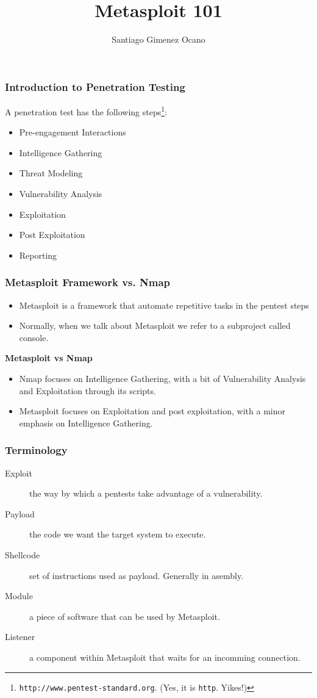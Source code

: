 \documentclass[aspectratio=169]{beamer}
\title{Metasploit 101}
\author{Santiago Gimenez Ocano}
\date{}
\begin{document}
\frame{\titlepage}

\begin{frame}
\frametitle{Introduction to Penetration Testing}
A penetration test has the following steps\footnote{\texttt{http://www.pentest-standard.org}. (Yes, it is \texttt{http}. Yikes!)}:

\begin{itemize}
    \item Pre-engagement Interactions
    \item Intelligence Gathering
    \item Threat Modeling
    \item Vulnerability Analysis
    \item Exploitation
    \item Post Exploitation
    \item Reporting
\end{itemize}

\end{frame}

\begin{frame}
\frametitle{Metasploit Framework vs. Nmap}

\begin{itemize}
    \item Metasploit is a framework that automate repetitive tasks in the pentest steps
    \item Normally, when we talk about Metasploit we refer to a subproject called console. \\
\end{itemize}

\vspace{10pt}

\textbf{Metasploit vs Nmap} 
\begin{itemize}
    \item Nmap focuses on Intelligence Gathering, with a bit of Vulnerability Analysis and Exploitation through its scripts.
    \item Metasploit focuses on Exploitation and post exploitation, with a minor emphasis on Intelligence Gathering.
\end{itemize}

\end{frame}

\begin{frame}
\frametitle{Terminology}

\begin{description}
    \item[Exploit] the way by which a pentests take advantage of a vulnerability.
    \item[Payload] the code we want the target system to execute.
    \item[Shellcode] set of instructions used as payload. Generally in asembly.
    \item[Module] a piece of software that can be used by Metasploit.
    \item[Listener] a component within Metasploit that waits for an incomming connection.
\end{description}

\end{frame}
\end{document}
